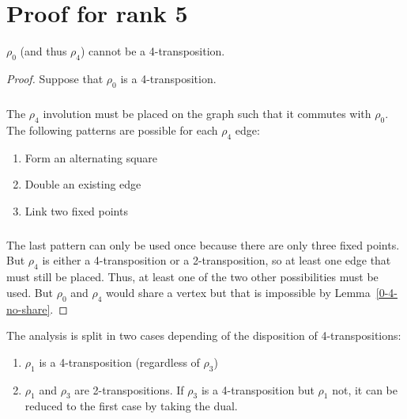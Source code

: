 \chapter{Proof for rank 5}

\begin{lemma}
  $\rho_0$ (and thus $\rho_4$) cannot be a 4-transposition.
\end{lemma}

\begin{proof}
  Suppose that $\rho_0$ is a 4-transposition.

  \paragraph{}
  The $\rho_4$ involution must be placed on the graph such that it commutes with $\rho_0$. The following patterns are possible for each $\rho_4$ edge:
  \begin{enumerate}
    \item Form an alternating square
    \item Double an existing edge
    \item Link two fixed points
  \end{enumerate}

  \paragraph{}
  The last pattern can only be used once because there are only three fixed points. But $\rho_4$ is either a 4-transposition or a 2-transposition, so at least one edge that must still be placed. Thus, at least one of the two other possibilities must be used. But $\rho_0$ and $\rho_4$ would share a vertex but that is impossible by Lemma~\ref{0-4-no-share}.
\end{proof}

The analysis is split in two cases depending of the disposition of 4-transpositions:
\begin{enumerate}
  \item $\rho_1$ is a 4-transposition (regardless of $\rho_3$)
  \item $\rho_1$ and $\rho_3$ are 2-transpositions. If $\rho_3$ is a 4-transposition but $\rho_1$ not, it can be reduced to the first case by taking the dual.
\end{enumerate}
